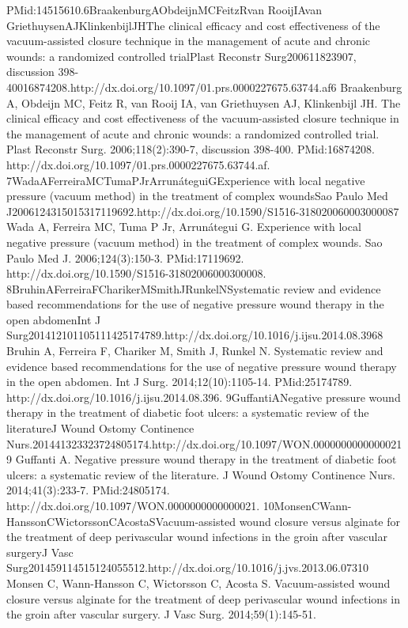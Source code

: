 \documentclass[numberinsection,times,10pt,spreadimages]{memoir}
\begin{document}
PMid:14515610.6BraakenburgAObdeijnMCFeitzRvan RooijIAvan
GriethuysenAJKlinkenbijlJHThe clinical efficacy and cost effectiveness of the
vacuum-assisted closure technique in the management of acute and chronic
wounds: a randomized controlled trialPlast Reconstr Surg200611823907, discussion
398-40016874208.http://dx.doi.org/10.1097/01.prs.0000227675.63744.af6
Braakenburg A, Obdeijn MC, Feitz R, van Rooij IA, van Griethuysen
AJ, Klinkenbijl JH. The clinical efficacy and cost effectiveness of the
vacuum-assisted closure technique in the management of acute and chronic wounds:
a randomized controlled trial. Plast Reconstr Surg. 2006;118(2):390-7,
discussion 398-400. PMid:16874208.
http://dx.doi.org/10.1097/01.prs.0000227675.63744.af.
7WadaAFerreiraMCTumaPJrArrunáteguiGExperience with local negative pressure
(vacuum method) in the
treatment of complex woundsSao Paulo Med
J2006124315015317119692.http://dx.doi.org/10.1590/S1516-318020060003000087 Wada
A, Ferreira MC, Tuma P Jr, Arrunátegui G. Experience with
local negative pressure (vacuum method) in the treatment of complex wounds. Sao
Paulo Med J. 2006;124(3):150-3. PMid:17119692.
http://dx.doi.org/10.1590/S1516-31802006000300008.
8BruhinAFerreiraFCharikerMSmithJRunkelNSystematic review and evidence based
recommendations for the use
of negative pressure wound therapy in the open abdomenInt J
Surg201412101105111425174789.http://dx.doi.org/10.1016/j.ijsu.2014.08.3968
Bruhin A, Ferreira F, Chariker M, Smith J, Runkel N. Systematic
review and evidence based recommendations for the use of negative pressure wound
therapy in the open abdomen. Int J Surg. 2014;12(10):1105-14. PMid:25174789.
http://dx.doi.org/10.1016/j.ijsu.2014.08.396. 9GuffantiANegative pressure wound
therapy in the treatment of diabetic foot
ulcers: a systematic review of the literatureJ Wound Ostomy Continence
Nurs.201441323323724805174.http://dx.doi.org/10.1097/WON.00000000000000219
Guffanti A. Negative pressure wound therapy in the treatment of
diabetic foot ulcers: a systematic review of the literature. J Wound Ostomy
Continence Nurs. 2014;41(3):233-7. PMid:24805174.
http://dx.doi.org/10.1097/WON.0000000000000021.
10MonsenCWann-HanssonCWictorssonCAcostaSVacuum-assisted wound closure versus
alginate for the treatment
of deep perivascular wound infections in the groin after vascular
surgeryJ Vasc
Surg201459114515124055512.http://dx.doi.org/10.1016/j.jvs.2013.06.07310 Monsen
C, Wann-Hansson C, Wictorsson C, Acosta S. Vacuum-assisted
wound closure versus alginate for the treatment of deep perivascular wound
infections in the groin after vascular surgery. J Vasc Surg. 2014;59(1):145-51.
\end{document}
